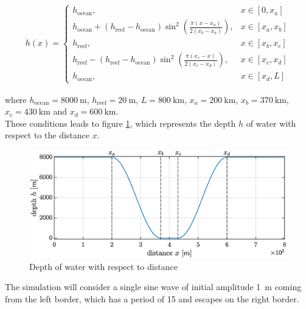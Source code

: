 \documentclass[a4paper,12pt,twoside]{article}
\newcommand{\bracket}[1]{\left(#1\right)}
\newcommand{\sqbracket}[1]{\left[#1\right]}
\begin{document}
      \begin{align}
        h(x)=
        \begin{cases}
          h_\text{ocean}, &x\in\sqbracket{0,x_a} \\
          h_\text{ocean} + \bracket{h_\text{reef} - h_\text{ocean}}\sin^2\bracket{\frac{\pi\bracket{x-x_a}}{2\bracket{x_b-x_a}}}, &x\in\sqbracket{x_a,x_b} \\
          h_\text{reef}, &x\in\sqbracket{x_b,x_c} \\
          h_\text{reef} - \bracket{h_\text{reef} - h_\text{ocean}}\sin^2\bracket{\frac{\pi\bracket{x_c - x}}{2\bracket{x_c-x_d}}}, &x\in\sqbracket{x_c,x_d} \\
          h_\text{ocean}, &x\in\sqbracket{x_d, L}
        \end{cases}
        \label{eq:h(x)}
      \end{align}

      where $h_\text{ocean} = \SI{8000}{\m}$, $h_\text{reef} = \SI{20}{\meter}$, $L=\SI{800}{\kilo\meter}$, $x_a = \SI{200}{\kilo\meter}$, $x_b = \SI{370}{\kilo\meter}$, $x_c=\SI{430}{\kilo\meter}$ and $x_d=\SI{600}{\kilo\meter}$.\\

      These conditions leads to figure \ref{fig:tsunami-depth}, which represents the depth $h$ of water with respect to the distance $x$.

      \begin{figure}[h]
        \centering
        \includegraphics[width=\textwidth]{graphs/tsunami_depth.eps}
        \caption{Depth of water with respect to distance}
        \label{fig:tsunami-depth}
      \end{figure}

      The simulation will consider a single sine wave of initial amplitude \SI{1}{\meter} coming from the left border, which has a period of \SI{15}{\min} and escapes on the right border.\\
\end{document}
